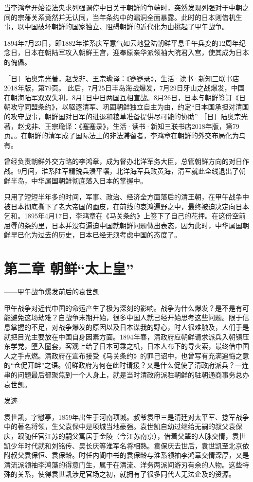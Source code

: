 \documentclass[12pt,UTF8]{ctexbook}
\begin{document}
当李鸿章开始设法央求列强调停中日关于朝鲜的争端时，突然发现列强对于中朝之间的宗藩关系竟然并无认同，当年条约中的漏洞全面暴露。此时的日本则借机生事，以中国破坏朝鲜的国家独立、阻碍朝鲜的近代化为由挑起了甲午战争。

1894年7月23日，即1882年淮系庆军意气如云地登陆朝鲜平息壬午兵变的12周年纪念日，日本在朝陆军攻入朝鲜王宫，迎奉原亲华派领袖大院君入宫，使其成为日本的傀儡。

［日］陆奥宗光著，赵戈非、王宗瑜译：《蹇蹇录》，生活·读书·新知三联书店2018年版，第79页。
此后，7月25日丰岛海战爆发，7月29日牙山之战爆发，中国在朝海陆军双双失利，8月1日中日两国互相宣战。8月26日，日本与朝鲜签订《日朝攻守同盟条约》，以驱逐清军、巩固朝鲜独立自主为由，约定“日本国承担对清国的攻守战事，朝鲜国对日军的进退和粮草准备提供尽可能的协助” ［日］陆奥宗光著，赵戈非、王宗瑜译：《蹇蹇录》，生活·读书·新知三联书店2018年版，第79页。。在朝鲜的清军成了国际法上的非法滞留者，李鸿章在朝鲜的外交布局化为乌有。

曾经负责朝鲜外交方略的李鸿章，成为督办北洋军务大臣，总管朝鲜方向的对日作战。9月间，淮系陆军精锐兵溃平壤，北洋海军兵败黄海，清军就此全线退出了朝鲜半岛，中华属国朝鲜彻底落入日本的掌握中。

只用了短短半年多的时间，军事、政治、经济全方面落后的清王朝，在甲午战争中被日本彻底撕下了老大帝国的画皮，在前线的哀鸿遍野之中，最终被迫决定向日本乞和。1895年4月17日，李鸿章在《马关条约》上签下了自己的花押。在这份空前屈辱的条约里，日本并没有逼迫中国就朝鲜问题做出表态，因为此时，中华属国朝鲜早已化为过去的历史，日本已经无须考虑中国的态度了。

\chapter{第二章 朝鲜“太上皇”}

——甲午战争爆发前后的袁世凯

甲午战争对近代中国的命运产生了极为深刻的影响。战争为什么爆发？是不是有可能避免这场劫难？自战争末期开始，很多中国人就已经开始思考这些问题。限于信息掌握的不足，对战争爆发的原因以及日本谋我的野心，时人很难触及，人们于是就把目光主要放在中国自身因素方面。1894年春，清政府应朝鲜请求派兵入朝镇压东学党，堕入圈套，客观上给了日本可乘之机，日本人布下的导火索，最终借中国人之手点燃。清政府在宣布接受《马关条约》的罪己诏中，也曾写有充满追悔之意的“仓促开衅”之语。朝鲜政府为何在此时请援？又是什么促使了清政府派兵？一连串的问题最后都聚焦到一个人身上，就是当时清政府派驻朝鲜的驻朝通商事务总办袁世凯。

发迹

袁世凯，字慰亭，1859年出生于河南项城。叔爷袁甲三是清廷对太平军、捻军战争中的著名将领，生父袁保中是项城当地豪强。袁世凯自幼过继给无嗣的叔父袁保庆，跟随任官江苏的嗣父寓居于金陵（今江苏南京），借着父辈的人脉交情，袁世凯少年时代就和刘铭传、吴长庆等淮军名将相熟。袁保庆去世后，袁世凯至北京依附叔父袁保恒、袁保龄。时任内阁中书的袁保龄与淮系领袖李鸿章交情深厚，又是清流派领袖李鸿藻的得意门生，属于在清流、洋务两派间游刃有余的人物。这些特殊的关系，使得袁世凯涉足官场之初，就拥有了很多同代人无法企及的资源。
\end{document}
